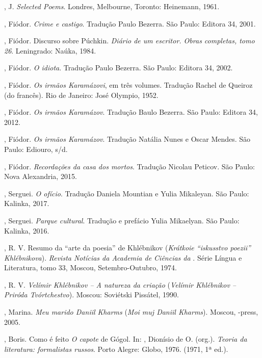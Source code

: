 \begin{Parskip}
{, J. \emph{Selected Poems}. Londres, Melbourne, Toronto: Heinemann, 1961.

, Fiódor. \emph{Crime e castigo}. Tradução Paulo Bezerra. São Paulo: Editora 34, 2001.

, Fiódor. Discurso sobre Púchkin. \emph{Diário de um escritor. Obras completas, tomo 26}. Leningrado: Naúka, 1984.

, Fiódor. \emph{O idiota}. Tradução Paulo Bezerra. São Paulo:
Editora 34, 2002.

, Fiódor. \emph{Os irmãos Karamázovi}, em três volumes. Tradução Rachel
de Queiroz (do francês). Rio de Janeiro: José Olympio, 1952.

, Fiódor. \emph{Os irmãos Karamázov}. Tradução Baulo Bezerra. São Paulo: Editora 34, 2012.

, Fiódor. \emph{Os irmãos Karamázov}. Tradução Natália Nunes e Oscar Mendes. São Paulo: Ediouro, s/d.

, Fiódor. \emph{Recordações da casa dos mortos}. Tradução Nicolau Peticov. São Paulo: Nova Alexandria, 2015.

, Serguei. \emph{O ofício}. Tradução Daniela Mountian e Yulia Mikaleyan. São Paulo: Kalinka, 2017.

, Serguei. \emph{Parque cultural}. Tradução e prefácio Yulia Mikaelyan. São Paulo: Kalinka, 2016.

, R. V. Resumo da ``arte da poesia'' de Khlébnikov (\emph{Krátkoie ``iskusstvo
poezii'' Khlébnikova}). \emph{Revista Notícias da Academia de Ciências da
}. Série Língua e Literatura, tomo 33, Moscou, Setembro-Outubro,
1974.

, R. V. \emph{Velímir Khlébnikov -- A natureza da criação} (\emph{Velímir Khlébnikov -- Priróda Tvórtchestvo}). Moscou: Soviétski Pissátel, 1990.

, Marina. \emph{Meu marido Daniil Kharms} (\emph{Moi muj Daniil Kharms}). Moscou, -press, 2005.

, Boris. Como é feito \emph{O capote} de Gógol. In: , Dionísio de O. (org.). \emph{Teoria da literatura: formalistas russos}. Porto Alegre: Globo, 1976. (1971, 1ª ed.).

}
\end{Parskip}
